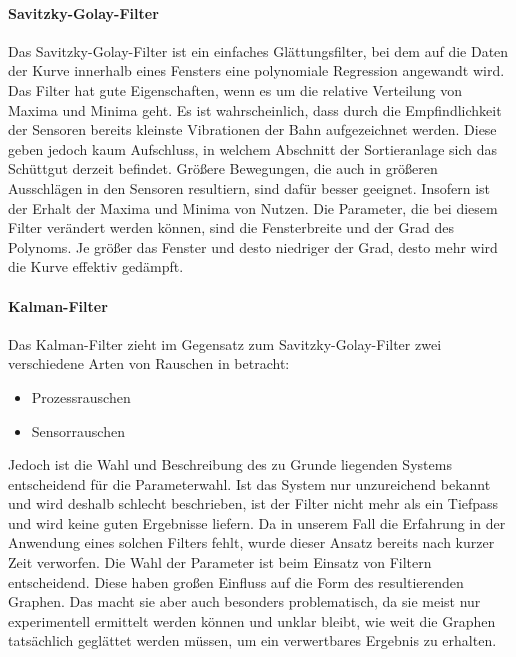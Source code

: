 \paragraph{Savitzky-Golay-Filter}
Das Savitzky-Golay-Filter ist ein einfaches Glättungsfilter, bei dem auf die Daten der Kurve innerhalb eines Fensters eine polynomiale Regression angewandt wird. Das Filter hat gute Eigenschaften, wenn es um die relative Verteilung von Maxima und Minima geht. Es ist wahrscheinlich, dass durch die Empfindlichkeit der Sensoren bereits kleinste Vibrationen der Bahn aufgezeichnet werden. Diese geben jedoch kaum Aufschluss, in welchem Abschnitt der Sortieranlage sich das Schüttgut derzeit befindet. Größere Bewegungen, die auch in größeren Ausschlägen in den Sensoren resultiern, sind dafür besser geeignet. Insofern ist der Erhalt der Maxima und Minima von Nutzen.
Die Parameter, die bei diesem Filter verändert werden können, sind die Fensterbreite und der Grad des Polynoms. Je größer das Fenster und desto niedriger der Grad, desto mehr wird die Kurve effektiv gedämpft.
\paragraph{Kalman-Filter}
Das Kalman-Filter zieht im Gegensatz zum Savitzky-Golay-Filter zwei verschiedene Arten von Rauschen in betracht:
\begin{itemize}
\item Prozessrauschen 
\item Sensorrauschen
\end{itemize}
Jedoch ist die Wahl und Beschreibung des zu Grunde liegenden Systems entscheidend für die Parameterwahl. Ist das System nur unzureichend bekannt und wird deshalb schlecht beschrieben, ist der Filter nicht mehr als ein Tiefpass und wird keine guten Ergebnisse liefern. Da in unserem Fall die Erfahrung in der Anwendung eines solchen Filters fehlt, wurde dieser Ansatz bereits nach kurzer Zeit verworfen.
Die Wahl der Parameter ist beim Einsatz von Filtern entscheidend. Diese haben großen Einfluss auf die Form des resultierenden Graphen. Das macht sie aber auch besonders problematisch, da sie meist nur experimentell ermittelt werden können und unklar bleibt, wie weit die Graphen tatsächlich geglättet werden müssen, um ein verwertbares Ergebnis zu erhalten. 